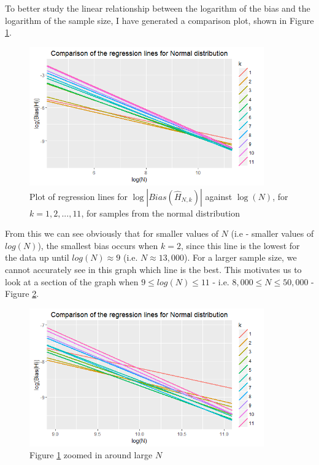 \documentclass[12pt]{report}
\begin{document}
To better study the linear relationship between the logarithm of the bias and the logarithm of the sample size, I have generated a comparison plot, shown in Figure \ref{normal_comparison_graph}. 

\begin{figure}
  \begin{center}
    \includegraphics[width=0.9\textwidth]{./Graphs/Best/NormalComparison.png}
  \end{center}
\caption{Plot of regression lines for $\log|Bias(\hat{H}_{N, k})|$ against $\log(N)$, for $k=1, 2,..., 11$, for samples from the normal distribution}
  \label{normal_comparison_graph}
\end{figure}

From this we can see obviously that for smaller values of $N$ (i.e - smaller values of $log(N)$), the smallest bias occurs when $k=2$, since this line is the lowest for the data up until $log(N) \approx 9$ (i.e. $N \approx 13,000$). For a larger sample size, we cannot accurately see in this graph which line is the best. This motivates us to look at a section of the graph when $9 \leq log(N) \leq 11$ - i.e. $8,000 \leq N \leq 50,000$ - Figure \ref{normal_comparison_graph_zoom}.

\begin{figure}
  \begin{center}
    \includegraphics[width=0.9\textwidth]{./Graphs/Best/NormalComparisonZoom.png}
  \end{center}
\caption{Figure \ref{normal_comparison_graph} zoomed in around large $N$}
  \label{normal_comparison_graph_zoom}
\end{figure}
\end{document}
